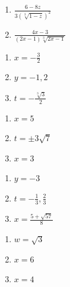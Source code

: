 \documentclass{ximera}
\begin{document}
\begin{multicols}{2}
\begin{enumerate}
\setcounter{enumi}{\value{HW}}

\item  $\frac{6-8z}{3 (\sqrt[3]{1-z})^2}$


\item  $\frac{4x-3}{(2x-1)\sqrt[3]{2x-1}}$  

\setcounter{HW}{\value{enumi}}
\end{enumerate}
\end{multicols}


\begin{multicols}{3}
\begin{enumerate}
\setcounter{enumi}{\value{HW}}

\item  $x = -\frac{3}{2}$ 
\item $y = -1, 2$ 
\item  $t = -\frac{\sqrt[3]{3}}{2}$ 


\setcounter{HW}{\value{enumi}}
\end{enumerate}
\end{multicols}

\begin{multicols}{3}
\begin{enumerate}
\setcounter{enumi}{\value{HW}}

\item $x = 5$
\item $t = \pm 3 \sqrt{7}$
\item $x=3$     

\setcounter{HW}{\value{enumi}}
\end{enumerate}
\end{multicols}


\begin{multicols}{3}
\begin{enumerate}
\setcounter{enumi}{\value{HW}}

\item  $y=-3$
\item  $t = -\frac{1}{3}, \frac{2}{3}$
\item $x = \frac{5 + \sqrt{57}}{8}$

\setcounter{HW}{\value{enumi}}
\end{enumerate}
\end{multicols}

\begin{multicols}{3}
\begin{enumerate}
\setcounter{enumi}{\value{HW}}


\item $w = \sqrt{3}$
\item $x = 6$
\item $x = 4$


\setcounter{HW}{\value{enumi}}
\end{enumerate}
\end{multicols}
\end{document}
